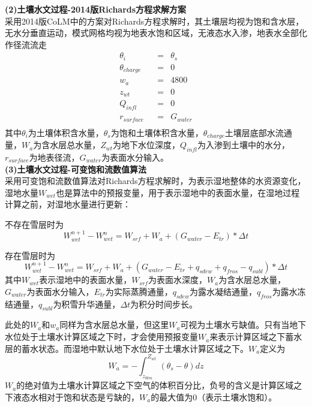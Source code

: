 \textbf {(2)土壤水文过程-2014版Richards方程求解方案}\\

采用2014版CoLM中的方案对Richards方程求解时，其土壤层均视为饱和含水层，无水分垂直运动，模式网格均视为地表水饱和区域，无液态水入渗，地表水全部化作径流流走
\begin{equation}
\begin{aligned}
    &\theta_{i} &&= &\theta_{s}& \\
    &\theta_{charge} &&=&0 &\\
    &w_a &&=&4800& \\
    &z_{wt} &&=&0& \\
    &Q_{infl} &&=&0& \\
    &r_{surface} &&=&G_{water}& \\
\end{aligned}
\end{equation}
其中$\theta_{i}$为土壤体积含水量，$\theta_{s}$为饱和土壤体积含水量，$\theta_{charge}$土壤层底部水流通量，$W_{a}$为含水层总水量，$Z_{wt}$为地下水位深度，$Q_{infl}$为入渗到土壤中的水分，$r_{surface}$为地表径流，$G_{water}$为表面水分输入。\\

\textbf {(3)土壤水文过程-可变饱和流数值算法}\\

采用可变饱和流数值算法对Richards方程求解时，为表示湿地整体的水资源变化，湿地水量$W_{wet}$也是算法中的预报变量，用于表示湿地中的表面水量，在湿地过程计算之前，对湿地水量进行更新：

不存在雪层时为
\begin{equation}
W_{wet}^{n+1}-W_{wet}^{n}=W_{srf}+W_{a}+\left(G_{water}-E_{tr}\right)*{\Delta t}
\end{equation}

存在雪层时为
\begin{equation}
W_{wet}^{n+1}-W_{wet}^{n}=W_{srf}+W_{a}+\left(G_{water}-E_{tr}+q_{sdew}+q_{fros}-q_{subl}\right)*{\Delta t}
\end{equation}
其中$W_{wet}$表示湿地中的表面水量，$W_{srf}$为表面水深度，$W_{a}$为含水层总水量，$G_{water}$为表面水分输入，$E_{tr}$为实际蒸腾通量，$q_{sdew}$为露水凝结通量，$q_{fros}$为露水冻结通量，$q_{subl}$为积雪升华通量，${\Delta t}$为积分时间步长。

此处的$W_a$和$w_a$同样为含水层总水量，但这里$W_a$可视为土壤水亏缺值。只有当地下水位处于土壤水计算区域之下时，才会使用预报变量$W_a$来表示计算区域之下蓄水层的蓄水状态。而湿地中默认地下水位处于土壤水计算区域之下。$W_a$定义为
\begin{equation}
W_{a}=-\int_{z_{b t m}}^{Z_{w t}}\left(\theta_{s}-\theta\right) d z
\end{equation}
$W_a$的绝对值为土壤水计算区域之下空气的体积百分比，负号的含义是计算区域之下液态水相对于饱和状态是亏缺的，$W_a$的最大值为0（表示土壤水饱和）。

